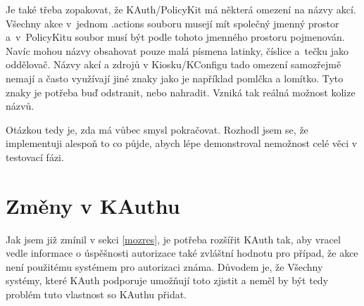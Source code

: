 {Je také třeba zopakovat, že KAuth/PolicyKit má některá omezení na názvy akcí. Všechny akce v~jednom .actions souboru musejí mít společný jmenný prostor a~v~PolicyKitu soubor musí být podle tohoto jmenného prostoru pojmenován. Navíc mohou názvy obsahovat pouze malá písmena latinky, číslice a~tečku jako oddělovač. Názvy akcí a zdrojů v Kiosku/KConfigu tado omezení samozřejmě nemají a často využívají jiné znaky jako je například pomlčka a lomítko. Tyto znaky je potřeba buď odstranit, nebo nahradit. Vzniká tak reálná možnost kolize názvů.

Otázkou tedy je, zda má vůbec smysl pokračovat. Rozhodl jsem se, že implementuji alespoň to co půjde, abych lépe demonstroval nemožnost celé věci v testovací fázi.
\section{Změny v KAuthu}
Jak jsem již zmínil v sekci \ref{mozres}, je potřeba rozšířit KAuth tak, aby vracel vedle informace o úspěšnosti autorizace také zvláštní hodnotu pro případ, že akce není použitému systémem pro autorizaci známa. Důvodem je, že  Všechny systémy, které KAuth podporuje umožňují toto zjistit a neměl by být tedy problém tuto vlastnost so KAuthu přidat.
}
